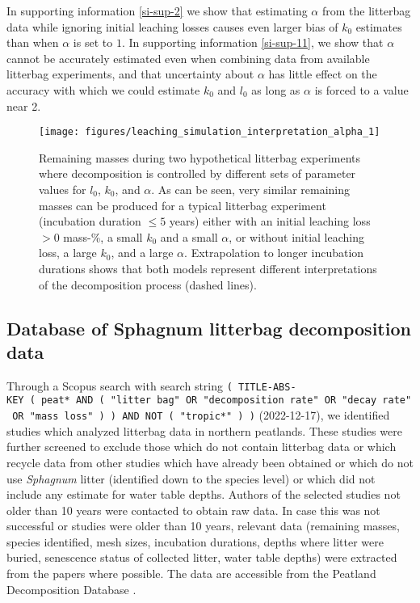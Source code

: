 \documentclass[bg, manuscript]{copernicus}
\begin{document}
In supporting information \ref{si-sup-2} we show that estimating \(\alpha\) from the litterbag data while ignoring initial leaching losses causes even larger bias of \(k_0\) estimates than when \(\alpha\) is set to \(1\). In supporting information \ref{si-sup-11}, we show that \(\alpha\) cannot be accurately estimated even when combining data from available litterbag experiments, and that uncertainty about \(\alpha\) has little effect on the accuracy with which we could estimate \(k_0\) and \(l_0\) as long as \(\alpha\) is forced to a value near 2.



\begin{figure}[H]

{\centering \texttt{[image: figures/leaching\_simulation\_interpretation\_alpha\_1]} 

}

\caption{Remaining masses during two hypothetical litterbag experiments where decomposition is controlled by different sets of parameter values for \(l_0\), \(k_0\), and \(\alpha\). As can be seen, very similar remaining masses can be produced for a typical litterbag experiment (incubation duration \(\le5\) years) either with an initial leaching loss \(>0\) mass-\%, a small \(k_0\) and a small \(\alpha\), or without initial leaching loss, a large \(k_0\), and a large \(\alpha\). Extrapolation to longer incubation durations shows that both models represent different interpretations of the decomposition process (dashed lines).}\label{fig:out-leaching-sim-interpretation-alpha}
\end{figure}

\subsection{Database of Sphagnum litterbag decomposition data}

Through a Scopus search with search string \texttt{(\ TITLE-ABS-KEY\ (\ peat*\ AND\ (\ "litter\ bag"\ OR\ "decomposition\ rate"\ OR\ "decay\ rate"\ OR\ "mass\ loss"\ )\ )\ AND\ NOT\ (\ "tropic*"\ )\ )} (2022-12-17), we identified studies which analyzed litterbag data in northern peatlands. These studies were further screened to exclude those which do not contain litterbag data or which recycle data from other studies which have already been obtained or which do not use \emph{Sphagnum} litter (identified down to the species level) or which did not include any estimate for water table depths. Authors of the selected studies not older than 10 years were contacted to obtain raw data. In case this was not successful or studies were older than 10 years, relevant data (remaining masses, species identified, mesh sizes, incubation durations, depths where litter were buried, senescence status of collected litter, water table depths) were extracted from the papers where possible. The data are accessible from the Peatland Decomposition Database \citep{Teickner.2024c}.
\end{document}
